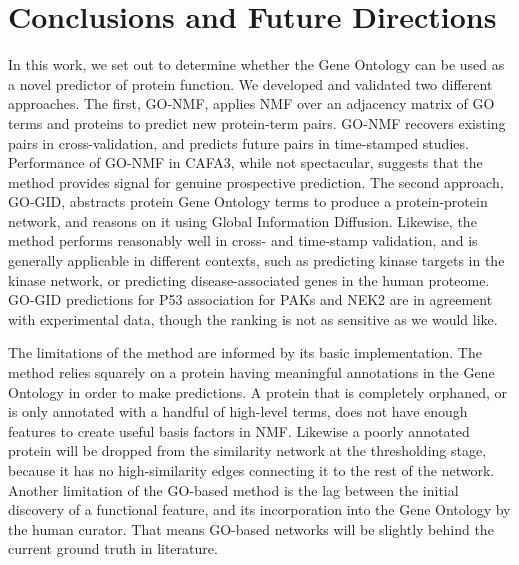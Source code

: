 \documentclass[12pt,a4paper]{report}
\begin{document}
{{\begin{figure}
\end{figure}

\section{Conclusions and Future Directions}

In this work, we set out to determine whether the Gene Ontology can be used as a novel predictor of protein function. We developed and validated two different approaches. The first, GO-NMF, applies NMF over an adjacency matrix of GO terms and proteins to predict new protein-term pairs. GO-NMF recovers existing pairs in cross-validation, and predicts future pairs in time-stamped studies. Performance of GO-NMF in CAFA3, while not spectacular, suggests that the method provides signal for genuine prospective prediction. The second approach, GO-GID, abstracts protein Gene Ontology terms to produce a protein-protein network, and reasons on it using Global Information Diffusion. Likewise, the method performs reasonably well in cross- and time-stamp validation, and is generally applicable in different contexts, such as predicting kinase targets in the kinase network, or predicting disease-associated genes in the human proteome. GO-GID predictions for P53 association for PAKs and NEK2 are in agreement with experimental data, though the ranking is not as sensitive as we would like.

The limitations of the method are informed by its basic implementation. The method relies squarely on a protein having meaningful annotations in the Gene Ontology in order to make predictions. A protein that is completely orphaned, or is only annotated with a handful of high-level terms, does not have enough features to create useful basis factors in NMF. Likewise a poorly annotated protein will be dropped from the similarity network at the thresholding stage, because it has no high-similarity edges connecting it to the rest of the network. Another limitation of the GO-based method is the lag between the initial discovery of a functional feature, and its incorporation into the Gene Ontology by the human curator. That means GO-based networks will be slightly behind the current ground truth in literature. 

}}
\end{document}

